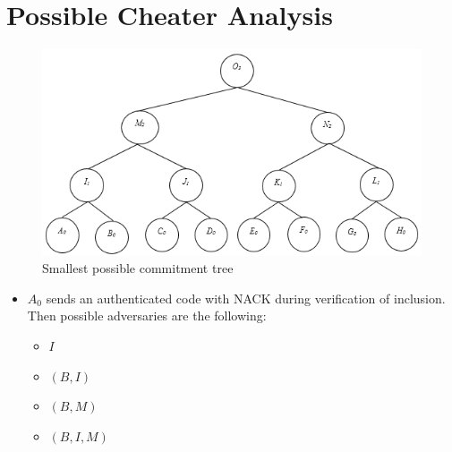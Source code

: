 \section{Possible Cheater Analysis}
	\begin{exmp}
		\begin{figure}[t]
			\centering
			\includegraphics{images/possible-cheaters.png}
			\caption{Smallest possible commitment tree}
			\label{fig:cheating}
		\end{figure}

		\begin{itemize}
			\item $A_{0}$ sends an authenticated code with NACK during verification of inclusion.
			Then possible adversaries are the following:
				\begin{itemize}
					\item $I$
					\item $(B, I)$
					\item $(B, M)$
					\item $(B, I, M)$
				\end{itemize}
		\end{itemize}
	\end{exmp}

	
  
  
